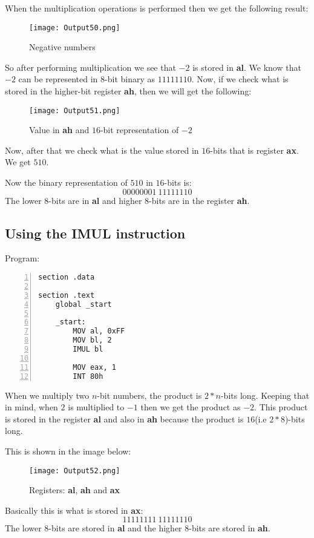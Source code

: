 \documentclass{article}
\makeatletter
\renewcommand\paragraph{\@startsection{paragraph}{4}{\z@}{-3.25ex \@plus -1ex \@minus -.2ex}{1.5ex \@plus .2ex}{\normalfont\normalsize\bfseries}}
\makeatother
\begin{document}
When the multiplication operations is performed then we get the following result:
\begin{figure}[h]
\centering
\texttt{[image: Output50.png]}
\caption{Negative numbers}
\label{fig:fig2}
\end{figure}

So after performing multiplication we see that $-2$ is stored in \textbf{al}. We know that $-2$ can be represented in $8$-bit binary as $11111110$.
\newpage
Now, if we check what is stored in the higher-bit register \textbf{ah}, then we will get the following:
\begin{figure}[h]
\centering
\texttt{[image: Output51.png]}
\caption{Value in \textbf{ah} and $16$-bit representation of $-2$}
\label{fig:fig3}
\end{figure}

Now, after that we check what is the value stored in $16$-bits that is register \textbf{ax}. We get $510$.

Now the binary representation of $510$ in $16$-bits is:
$$
00000001\ 11111110
$$
The lower $8$-bits are in \textbf{al} and higher $8$-bits are in the register \textbf{ah}.
\newpage
\subsection{Using the IMUL instruction}\label{sec:subsec2}
\paragraph{}
Program:
\begin{Verbatim}[numbers=left, frame=single]
section .data

section .text
	global _start
	
	_start:
		MOV al, 0xFF
		MOV bl, 2
		IMUL bl
		
		MOV eax, 1
		INT 80h
\end{Verbatim}
When we multiply two $n$-bit numbers, the product is $2*n$-bits long. Keeping that in mind, when $2$ is multiplied to $-1$ then we get the product as $-2$. This product is stored in the register \textbf{al} and also in \textbf{ah} because the product is $16$(i.e $2*8$)-bits long.

This is shown in the image below:
\begin{figure}[h]
\centering
\texttt{[image: Output52.png]}
\caption{Registers: \textbf{al}, \textbf{ah} and \textbf{ax}}
\label{fig:fig4}
\end{figure}

Basically this is what is stored in \textbf{ax}:
$$
11111111\ 11111110
$$
The lower $8$-bits are stored in \textbf{al} and the higher $8$-bits are stored in \textbf{ah}.
\end{document}
